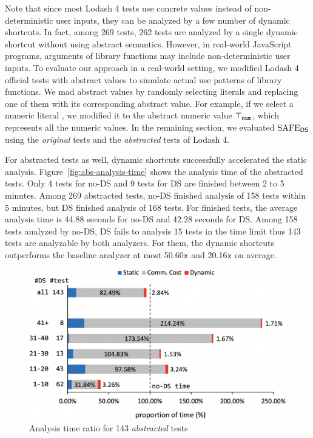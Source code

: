 Note that since most Lodash 4 tests use concrete values instead of
non-deterministic user inputs, they can be analyzed by a few number of dynamic shortcuts.
In fact, among 269 tests, 262 tests are analyzed
by a single dynamic shortcut without using abstract semantics.
However, in real-world JavaScript programs, arguments of library
functions may include non-deterministic user inputs.
To evaluate our approach in a real-world setting,
we modified Lodash 4 official tests with abstract values to simulate actual use patterns of library functions.
We mad abstract values by randomly selecting literals and replacing
one of them with its corresponding abstract value.
For example, if we select a numeric literal , we modified it to the abstract numeric value
$\top_{\texttt{num}}$, which represents all the numeric values.
In the remaining section, we evaluated $\text{SAFE}_{\textsf{DS}}$ using the \textit{original} tests
and the \textit{abstracted} tests of Lodash 4.

For abstracted tests as well, dynamic shortcuts successfully accelerated the static analysis.
Figure~\ref{fig:abs-analysis-time} shows the analysis time of the abstracted tests.
Only 4 tests for no-DS and 9 tests for DS are finished between 2 to 5 minutes.
Among 269 abstracted tests, no-DS finished analysis of 158 tests within 5 minutes,
but DS finished analysis of 168 tests.  For finished tests, the average analysis
time is 44.88 seconds for no-DS and 42.28 seconds for DS. Among 158 tests analyzed by no-DS, DS
fails to analysis 15 tests in the time limit thus 143 tests are analyzable by
both analyzers.  For them, the dynamic shortcuts outperforms the baseline
analyzer at most 50.60${\textsf{x}}$ and 20.16${\textsf{x}}$ on average.

\begin{figure}[t]
  \centering
  \includegraphics[width=\linewidth]{img/abs-analysis-ratio}
  \vspace*{-1.5em}
  \caption{Analysis time ratio for 143 \textit{abstracted} tests}
  \label{fig:abs-analysis-ratio}
  \vspace*{-1.5em}
\end{figure}

